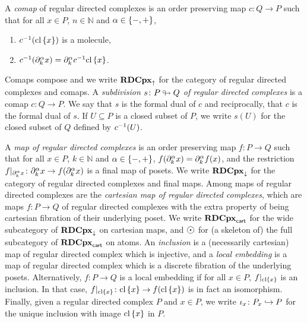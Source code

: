 A \emph{comap} of regular directed complexes is an order preserving map \( c \colon Q \to P \) such that for all \( x \in P \), \( n \in \mathbb{N} \) and \( \alpha \in \left\{ {-, +} \right\} \), 
\begin{enumerate}
    \item \( c^{-1}(\mathrm{cl}\left\{ {x} \right\}) \) is a molecule, 
    \item \( c^{-1}(\partial_{k}^{\alpha} x) = \partial_{k}^{\alpha} c^{-1}\mathrm{cl}\left\{ {x} \right\} \).
\end{enumerate}
Comaps compose and we write \( \mathbf{RDCpx}_{\uparrow} \) for the category of regular directed complexes and comaps.
A \emph{subdivision \( s \colon P \looparrowright Q \) of regular directed complexes} is a comap \( c \colon Q \to P \).
We say that \( s \) is the formal dual of \( c \) and reciprocally, that \( c \) is the formal dual of \( s \).
If \( U \subseteq P \) is a closed subset of \( P \), we write \( s(U) \) for the closed subset of \( Q \) defined by \( c^{-1}(U) \).

A \emph{map of regular directed complexes} is an order preserving map \( f \colon P \to Q \) such that for all \( x \in P \), \( k \in \mathbb{N} \) and \( \alpha \in \left\{ {-, +} \right\} \), \( f(\partial_{k}^{\alpha}x) = \partial_{k}^{\alpha} f(x) \), and the restriction \( \restr{f}{\bd{k}{\a} x} \colon \bd{k}{\a} x \to f(\bd{k}{\a} x) \) is a final map of posets. 
We write \( \mathbf{RDCpx}_{\downarrow} \) for the category of regular directed complexes and final maps.
Among maps of regular directed complexes are the \emph{cartesian map of regular directed complexes}, which are maps \( f \colon P \to Q \) of regular directed complexes with the extra property of being cartesian fibration of their underlying poset.
We write \( \mathbf{RDCpx}_{\mathsf{cart}} \) for the wide subcategory of \( \mathbf{RDCpx}_{\downarrow} \) on cartesian maps, and \( \atom \) for (a skeleton of) the full subcategory of \( \mathbf{RDCpx}_{\mathsf{cart}} \) on atoms.
An \emph{inclusion} is a (necessarily cartesian) map of regular directed complex which is injective, and a \emph{local embedding} is a map of regular directed complex which is a discrete fibration of the underlying posets.
Alternatively, \( f \colon P \to Q \) is a local embedding if for all \( x \in P \), \( \restr{f}{\clset{x}} \) is an inclusion.
In that case, \( \restr{f}{\clset{x}} \colon \clset{x} \to f(\clset{x}) \) is in fact an isomorphism.
Finally, given a regular directed complex \( P \) and \( x \in P \), we write \( \iota_{x} \colon {P}_{x} \hookrightarrow P \) for the unique inclusion with image \( \mathrm{cl}\left\{ {x} \right\} \) in \( P \).


